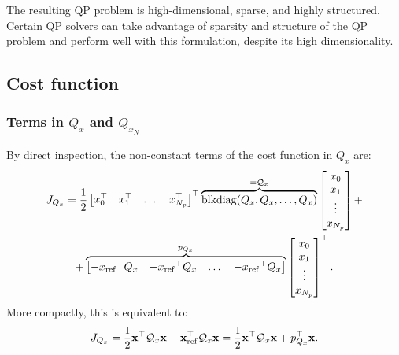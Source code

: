 \documentclass[a4paper,12pt,fleqn]{article}
\newcommand{\varxvec}{\mathbf{x}}
\newcommand{\Np}{{N_p}}
\newcommand{\blkdiag}{\text{blkdiag}}
\begin{document}
The resulting QP problem is high-dimensional, sparse, and highly structured. 
Certain QP solvers can take advantage of sparsity and structure of the QP problem and perform well with this formulation, despite its high dimensionality.

\subsection{Cost function}
\subsubsection{Terms in $Q_x$ and $Q_{x_N}$}
By direct inspection, the non-constant terms of the cost function in $Q_x$ are:
\begin{multline}
\label{eq:J_Qx}
 J_{Q_x} = \frac{1}{2}
 \begin{bmatrix}
  x_0^\top & x_1^\top &\dots & x_{\Np}^\top
 \end{bmatrix}^\top
 \overbrace{\blkdiag(Q_x, Q_x, \dots, Q_x)}^{=\mathcal{Q}_x}
 \begin{bmatrix}
  x_0 \\  x_1\\ \vdots\\  x_{\Np}
 \end{bmatrix} + \\
 +
 \overbrace{
  \begin{bmatrix}
  -{x_{\rm ref}}^\top Q_x & -{x_{\rm ref}}^\top Q_x &\dots & -{x_{\rm ref}}^\top Q_x
 \end{bmatrix} 
 }^{p_{Q_x}}
 \begin{bmatrix}
  x_0 \\ x_1 \\ \vdots \\ x_{\Np}
 \end{bmatrix}^\top.
 \end{multline}
 More compactly, this is equivalent to:
 \begin{equation}
  J_{Q_x} = \frac{1}{2} \varxvec^\top \mathcal{Q}_x \varxvec - \varxvec_{\rm ref}^\top \mathcal{Q}_x \varxvec = \frac{1}{2} \varxvec^\top \mathcal{Q}_x \varxvec + p_{Q_x}^\top \varxvec.
 \end{equation}
\end{document}
